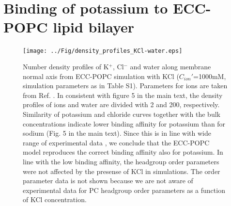 \documentclass[journal=jpcbfk]{achemso}
\begin{document}
\newpage
\section{Binding of potassium to ECC-POPC lipid bilayer}
\begin{figure}[!h]
  \centering
  \texttt{[image: ../Fig/density\_profiles\_KCl-water.eps]}
  \caption{\label{Kdens}
    Number density profiles of K$^+$, Cl$^-$ and water along membrane normal
    axis from ECC-POPC simulation with KCl ($C_{ion}'$=1000mM, simulation parameters as in Table S1).
    Parameters for ions are taken from Ref. .
    In consistent with figure 5 in the main text, the density profiles of ions and water
    are divided with 2 and 200, respectively. Similarity of potassium
    and chloride curves together with the bulk concentrations indicate lower binding 
    affinity for potassium than for sodium (Fig. 5 in the main text).
    Since this is in line with wide range of experimental data \cite{eisenberg79,binder02,klasczyk10}, we conclude
    that the ECC-POPC model reproduces the correct binding affinity also for potassium.
    In line with the low binding affinity, the headgroup order parameters were not
    affected by the presense of KCl in simulations. The order parameter 
    data is not shown because we are not aware of experimental data for PC headgroup
    order parameters as a function of KCl concentration.
  }
\end{figure}

\newpage

\end{document}
